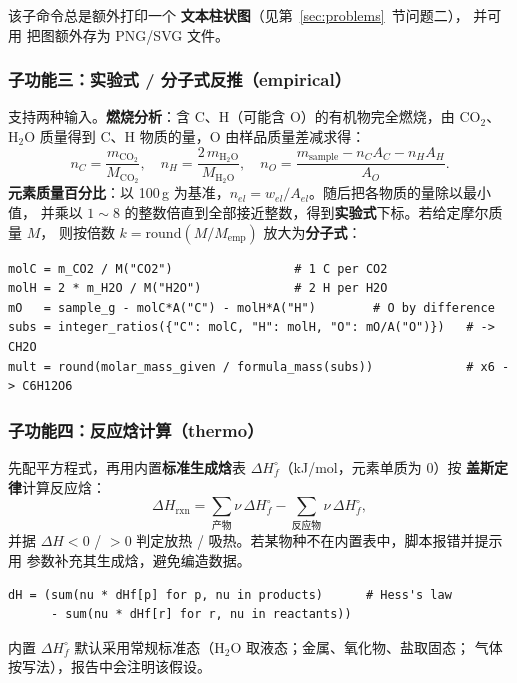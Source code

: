 \documentclass[UTF8,a4paper,12pt]{ctexart}
\begin{document}
该子命令总是额外打印一个 \codepath{[CHART]} \textbf{文本柱状图}（见第~\ref{sec:problems}~节问题二），
并可用  把图额外存为 PNG/SVG 文件。

\subsubsection{子功能三：实验式 / 分子式反推（empirical）}

支持两种输入。\textbf{燃烧分析}：含 C、H（可能含 O）的有机物完全燃烧，由 $\mathrm{CO_2}$、
$\mathrm{H_2O}$ 质量得到 C、H 物质的量，O 由样品质量差减求得：
\[
    n_C = \frac{m_{\mathrm{CO_2}}}{M_{\mathrm{CO_2}}},\quad
    n_H = \frac{2\,m_{\mathrm{H_2O}}}{M_{\mathrm{H_2O}}},\quad
    n_O = \frac{m_\text{sample} - n_C A_C - n_H A_H}{A_O}.
\]
\textbf{元素质量百分比}：以 100\,g 为基准，$n_{el} = w_{el}/A_{el}$。随后把各物质的量除以最小值，
并乘以 $1\!\sim\!8$ 的整数倍直到全部接近整数，得到\textbf{实验式}下标。若给定摩尔质量 $M$，
则按倍数 $k=\mathrm{round}(M/M_\text{emp})$ 放大为\textbf{分子式}：

\begin{lstlisting}
molC = m_CO2 / M("CO2")                 # 1 C per CO2
molH = 2 * m_H2O / M("H2O")             # 2 H per H2O
mO   = sample_g - molC*A("C") - molH*A("H")        # O by difference
subs = integer_ratios({"C": molC, "H": molH, "O": mO/A("O")})   # -> CH2O
mult = round(molar_mass_given / formula_mass(subs))             # x6 -> C6H12O6
\end{lstlisting}

\subsubsection{子功能四：反应焓计算（thermo）}

先配平方程式，再用内置\textbf{标准生成焓}表 $\Delta H_f^\circ$（kJ/mol，元素单质为 0）按
\textbf{盖斯定律}计算反应焓：
\[
    \Delta H_\text{rxn} = \sum_{\text{产物}} \nu\,\Delta H_f^\circ
                        - \sum_{\text{反应物}} \nu\,\Delta H_f^\circ ,
\]
并据 $\Delta H<0$ / $>0$ 判定放热 / 吸热。若某物种不在内置表中，脚本报错并提示用
 参数补充其生成焓，避免编造数据。

\begin{lstlisting}
dH = (sum(nu * dHf[p] for p, nu in products)      # Hess's law
      - sum(nu * dHf[r] for r, nu in reactants))
\end{lstlisting}

内置 $\Delta H_f^\circ$ 默认采用常规标准态（$\mathrm{H_2O}$ 取液态；金属、氧化物、盐取固态；
气体按写法），报告中会注明该假设。
\end{document}
